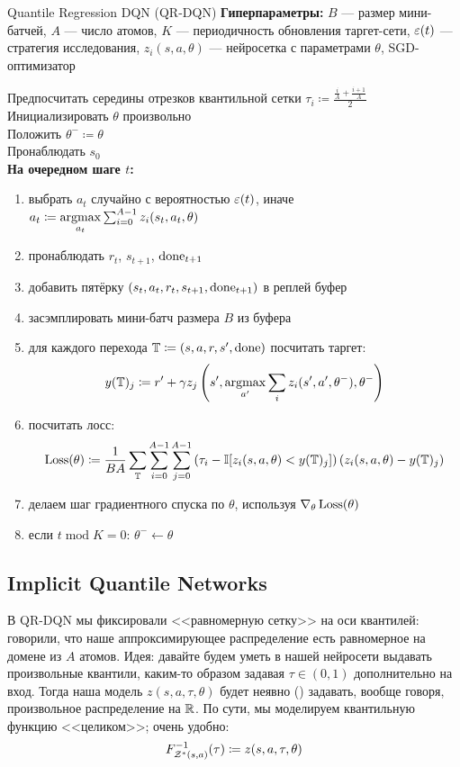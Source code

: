 \begin{algorithm}[label = QRDQNalgorithm]{Quantile Regression DQN (QR-DQN)}
\textbf{Гиперпараметры:} $B$ --- размер мини-батчей, $A$ --- число атомов, $K$ --- периодичность обновления таргет-сети, $\varepsilon(t)$ --- стратегия исследования, $z_i(s, a, \theta)$ --- нейросетка с параметрами $\theta$, SGD-оптимизатор

\vspace{0.3cm}
Предпосчитать середины отрезков квантильной сетки $\tau_i \coloneqq \frac{\frac{i}{A} + \frac{i+1}{A}}{2}$ \\
Инициализировать $\theta$ произвольно \\
Положить $\theta^- \coloneqq \theta$ \\
Пронаблюдать $s_0$ \\
\textbf{На очередном шаге $t$:}
\begin{enumerate}
    \item выбрать $a_t$ случайно с вероятностью $\varepsilon(t)$, иначе $a_t \coloneqq \mathop{\mathrm{argmax}}\limits_{a_t} \sum_{i=0}^{A-1} z_i(s_t, a_t, \theta)$
    \item пронаблюдать $r_t$,  $s_{t+1}$, $\mathrm{done}_{t+1}$
    \item добавить пятёрку $(s_t, a_t, r_t, s_{t+1}, \mathrm{done}_{t+1})$ в реплей буфер
    \item засэмплировать мини-батч размера $B$ из буфера
    \item для каждого перехода $\mathbb{T} \coloneqq (s, a, r, s', \mathrm{done})$ посчитать таргет:
    $$y(\mathbb{T})_j \coloneqq r' + \gamma z_j\left( s', \mathop{\mathrm{argmax}}\limits_{a'} \sum_{i} z_i(s', a', \theta^-), \theta^- \right) $$
    \item посчитать лосс:
    $$\operatorname{Loss}(\theta) \coloneqq \frac{1}{BA}\sum_{\mathbb{T}} \sum_{i=0}^{A-1} \sum_{j=0}^{A-1} \left( \tau_i - \mathbb{I}[z_i(s, a, \theta) < y(\mathbb{T})_j] \right) \left( z_i(s, a, \theta) - y(\mathbb{T})_j \right)$$
    \item делаем шаг градиентного спуска по $\theta$, используя $\nabla_\theta \operatorname{Loss}(\theta)$
    \item если $t \operatorname{mod} K = 0$: $\theta^- \gets \theta$
\end{enumerate}
\end{algorithm}

\subsection{Implicit Quantile Networks}\label{subsec:iqn}

В QR-DQN мы фиксировали <<равномерную сетку>> на оси квантилей: говорили, что наше аппроксимирующее распределение есть равномерное на домене из $A$ атомов. Идея: давайте будем уметь в нашей нейросети выдавать произвольные квантили, каким-то образом задавая $\tau \in (0, 1)$ дополнительно на вход. Тогда наша модель $z(s, a, \tau, \theta)$ будет неявно () задавать, вообще говоря, произвольное распределение на $\mathbb{R}$. По сути, мы моделируем квантильную функцию <<целиком>>; очень удобно:
$$F^{-1}_{\mathcal{Z}^*(s, a)}(\tau) \coloneqq z(s, a, \tau, \theta)$$

